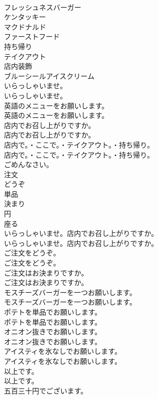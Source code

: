 \documentclass[8pt]{extreport}
\begin{document}
\begin{CJK}{UTF8}{min}
\\	フレッシュネスバーガー
\\	ケンタッキー
\\	マクドナルド
\\	ファーストフード
\\	持ち帰り
\\	テイクアウト
\\	店内装飾
\\	ブルーシールアイスクリーム
\\	いらっしゃいませ。	
\\	いらっしゃいませ。 
\\	英語のメニューをお願いします。	
\\	英語のメニューをお願いします。 
\\	店内でお召し上がりですか。	
\\	店内でお召し上がりですか。 
\\	店内で。・ここで。・テイクアウト。・持ち帰り。	
\\	店内で。・ここで。・テイクアウト。・持ち帰り。 
\\	ごめんなさい。
\\	注文
\\	どうぞ
\\	単品
\\	決まり
\\	円
\\	座る
\\	いらっしゃいませ。店内でお召し上がりですか。	
\\	いらっしゃいませ。店内でお召し上がりですか。 
\\	ご注文をどうぞ。	
\\	ご注文をどうぞ。 
\\	ご注文はお決まりですか。	
\\	ご注文はお決まりですか。 
\\	モスチーズバーガーを一つお願いします。	
\\	モスチーズバーガーを一つお願いします。 
\\	ポテトを単品でお願いします。	
\\	ポテトを単品でお願いします。 
\\	オニオン抜きでお願いします。	
\\	オニオン抜きでお願いします。 
\\	アイスティを氷なしでお願いします。	
\\	アイスティを氷なしでお願いします。 
\\	以上です。	
\\	以上です。 
\\	五百三十円でございます。	

\end{CJK}
\end{document}
